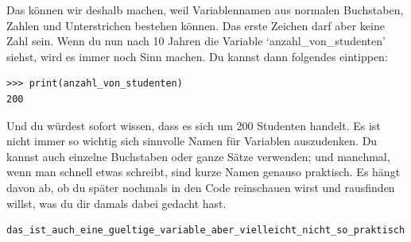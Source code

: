 Das können wir deshalb machen, weil Variablennamen aus normalen Buchstaben, Zahlen und Unterstrichen bestehen können. Das erste Zeichen darf aber keine Zahl sein. Wenn du nun nach 10 Jahren die Variable `anzahl\_von\_studenten' siehst, wird es immer noch Sinn machen. Du kannst dann folgendes eintippen:

\begin{Verbatim}[frame=single]
>>> print(anzahl_von_studenten)
200
\end{Verbatim}

\noindent
Und du würdest sofort wissen, dass es sich um 200 Studenten handelt. Es ist nicht immer so wichtig sich sinnvolle Namen für Variablen auszudenken. Du kannst auch einzelne Buchstaben oder ganze Sätze verwenden; und manchmal, wenn man schnell etwas schreibt, sind kurze Namen genauso praktisch. Es hängt davon ab, ob du später nochmals in den Code reinschauen wirst und rausfinden willst, was du dir damals dabei gedacht hast.

\begin{Verbatim}[frame=single]
das_ist_auch_eine_gueltige_variable_aber_vielleicht_nicht_so_praktisch
\end{Verbatim}

